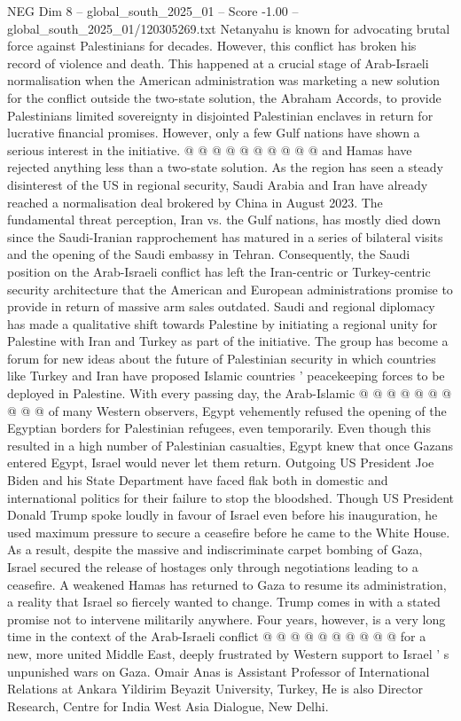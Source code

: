 \begin{textsample}{NEG Dim 8 – global\_south\_2025\_01 – Score -1.00 – global\_south\_2025\_01/120305269.txt}
Netanyahu is known for advocating brutal force against Palestinians for decades.
However, this conflict has broken his record of violence and death.
This happened at a crucial stage of Arab-Israeli normalisation when the American administration was marketing a new solution for the conflict outside the two-state solution, the Abraham Accords, to provide Palestinians limited sovereignty in disjointed Palestinian enclaves in return for lucrative financial promises.
However, only a few Gulf nations have shown a serious interest in the initiative. @ @ @ @ @ @ @ @ @ @ and Hamas have rejected anything less than a two-state solution.
As the region has seen a steady disinterest of the US in regional security, Saudi Arabia and Iran have already reached a normalisation deal brokered by China in August 2023.
The fundamental threat perception, Iran vs. the Gulf nations, has mostly died down since the Saudi-Iranian rapprochement has matured in a series of bilateral visits and the opening of the Saudi embassy in Tehran.
Consequently, the Saudi position on the Arab-Israeli conflict has left the Iran-centric or Turkey-centric security architecture that the American and European administrations promise to provide in return of massive arm sales outdated.
Saudi and regional diplomacy has made a qualitative shift towards Palestine by initiating a regional unity for Palestine with Iran and Turkey as part of the initiative.
The group has become a forum for new ideas about the future of Palestinian security in which countries like Turkey and Iran have proposed Islamic countries ' peacekeeping forces to be deployed in Palestine.
With every passing day, the Arab-Islamic @ @ @ @ @ @ @ @ @ @ of many Western observers, Egypt vehemently refused the opening of the Egyptian borders for Palestinian refugees, even temporarily.
Even though this resulted in a high number of Palestinian casualties, Egypt knew that once Gazans entered Egypt, Israel would never let them return.
Outgoing US President Joe Biden and his State Department have faced flak both in domestic and international politics for their failure to stop the bloodshed.
Though US President Donald Trump spoke loudly in favour of Israel even before his inauguration, he used maximum pressure to secure a ceasefire before he came to the White House.
As a result, despite the massive and indiscriminate carpet bombing of Gaza, Israel secured the release of hostages only through negotiations leading to a ceasefire.
A weakened Hamas has returned to Gaza to resume its administration, a reality that Israel so fiercely wanted to change.
Trump comes in with a stated promise not to intervene militarily anywhere.
Four years, however, is a very long time in the context of the Arab-Israeli conflict @ @ @ @ @ @ @ @ @ @ for a new, more united Middle East, deeply frustrated by Western support to Israel ' s unpunished wars on Gaza.
Omair Anas is Assistant Professor of International Relations at Ankara Yildirim Beyazit University, Turkey, He is also Director Research, Centre for India West Asia Dialogue, New Delhi.

\end{textsample}
